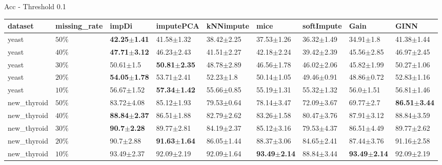  Acc - Threshold 0.1 
 \begin{tabular}{lllllllll}
\toprule
    dataset & missing_rate &                   impDi &               imputePCA &      kNNimpute &                    mice &             softImpute &                    Gain &                    GINN \\
\midrule
      yeast &     $ 50\% $ & \textbf{42.25$\pm$1.41} &          41.58$\pm$1.32 & 38.42$\pm$2.25 &          37.53$\pm$1.26 &         36.32$\pm$1.49 &           34.91$\pm$1.8 &          41.38$\pm$1.44 \\
      yeast &     $ 40\% $ & \textbf{47.71$\pm$3.12} &          46.23$\pm$2.43 & 41.51$\pm$2.27 &          42.18$\pm$2.24 &         39.42$\pm$2.39 &          45.56$\pm$2.85 &          46.97$\pm$2.45 \\
      yeast &     $ 30\% $ &           50.61$\pm$1.5 & \textbf{50.81$\pm$2.35} & 48.78$\pm$2.89 &          46.56$\pm$1.78 &         46.02$\pm$2.06 &          45.82$\pm$1.99 &          50.27$\pm$1.06 \\
      yeast &     $ 20\% $ & \textbf{54.05$\pm$1.78} &          53.71$\pm$2.41 &  52.23$\pm$1.8 &          50.14$\pm$1.05 &         49.46$\pm$0.91 &          48.86$\pm$0.72 &          52.83$\pm$1.16 \\
      yeast &     $ 10\% $ &          56.67$\pm$1.52 & \textbf{57.34$\pm$1.42} & 55.66$\pm$0.85 &          55.19$\pm$1.31 &         55.32$\pm$1.32 &           56.0$\pm$1.51 &          56.81$\pm$1.46 \\
new_thyroid &     $ 50\% $ &          83.72$\pm$4.08 &          85.12$\pm$1.93 & 79.53$\pm$0.64 &          78.14$\pm$3.47 &         72.09$\pm$3.67 &           69.77$\pm$2.7 & \textbf{86.51$\pm$3.44} \\
new_thyroid &     $ 40\% $ & \textbf{88.84$\pm$2.37} &          86.51$\pm$1.88 & 82.79$\pm$2.62 &          83.26$\pm$1.58 &         80.47$\pm$3.76 &          87.91$\pm$3.12 &          88.84$\pm$3.59 \\
new_thyroid &     $ 30\% $ &  \textbf{90.7$\pm$2.28} &          89.77$\pm$2.81 & 84.19$\pm$2.37 &          85.12$\pm$3.16 &         79.53$\pm$4.37 &          86.51$\pm$4.49 &          89.77$\pm$2.62 \\
new_thyroid &     $ 20\% $ &           90.7$\pm$2.88 & \textbf{91.63$\pm$1.64} & 86.05$\pm$1.44 &          88.37$\pm$3.06 &         84.65$\pm$2.41 &          87.44$\pm$3.76 &          91.16$\pm$2.58 \\
new_thyroid &     $ 10\% $ &          93.49$\pm$2.37 &          92.09$\pm$2.19 & 92.09$\pm$1.64 & \textbf{93.49$\pm$2.14} &         88.84$\pm$3.44 & \textbf{93.49$\pm$2.14} &          92.09$\pm$2.19 \\

\end{tabular}
